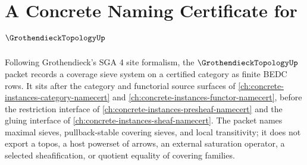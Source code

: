 \chapter{A Concrete Naming Certificate for $\GrothendieckTopologyUp$}
\label{ch:concrete-instances-grothendieck-topology-namecert}

Following Grothendieck's SGA 4 site formalism, the $\GrothendieckTopologyUp$ packet records a coverage sieve system on a certified category as finite BEDC rows. It sits after the category and functorial source surfaces of \autoref{ch:concrete-instances-category-namecert} and \autoref{ch:concrete-instances-functor-namecert}, before the restriction interface of \autoref{ch:concrete-instances-presheaf-namecert} and the gluing interface of \autoref{ch:concrete-instances-sheaf-namecert}. The packet names maximal sieves, pullback-stable covering sieves, and local transitivity; it does not export a topos, a host powerset of arrows, an external saturation operator, a selected sheafification, or quotient equality of covering families.

